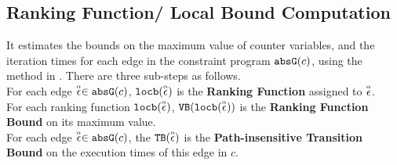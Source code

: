 \subsection{Ranking Function/ Local Bound Computation}
\label{sec:ranking}
It estimates the bounds on the maximum value of counter variables, and
the iteration times
for each edge in the constraint program $\absG(c)$, using the method in \cite{sinn2017complexity}.
There are three sub-steps as follows.
\\
For each edge $\absevent \in \absG(c)$,
$\locbound(\absevent)$ is the \textbf{Ranking Function} assigned to $\absevent$.
\\
For each ranking function $\locbound(\absevent)$, $\varinvar(\locbound(\absevent))$ is
the \textbf{Ranking Function Bound} on its maximum value.
\\
For each edge $\absevent \in \absG(c)$, the $\absclr(\absevent)$ is the \textbf{Path-insensitive Transition Bound}
on the execution times of this edge in $c$.
